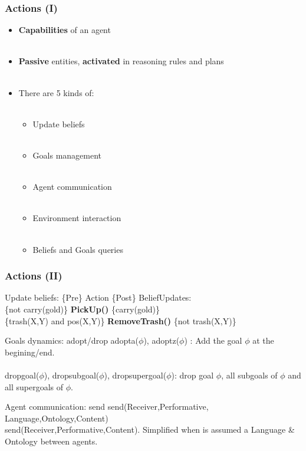 \documentclass{beamer}
\newcommand\tab[1][1cm]{\hspace*{#1}}
\begin{document}
\begin{frame}
\frametitle{Actions (I)}
	\begin{itemize}
    	\item \textbf{Capabilities} of an agent \\~\\
        \item \textbf{Passive} entities, \textbf{activated} in reasoning rules and plans\\~\\
        \item There are 5 kinds of:\\~\\
        \begin{itemize}
        	\item Update beliefs\\~\\
            \item Goals management \\~\\
            \item Agent communication\\~\\
            \item Environment interaction\\~\\
            \item Beliefs and Goals queries
        \end{itemize}
    \end{itemize}
\end{frame}
\begin{frame}
\frametitle{Actions (II)}
	\begin{block}{Update beliefs: \{Pre\} Action \{Post\}}
      BeliefUpdates:\\
        \tab \{not carry(gold)\} \textbf{PickUp()} \{carry(gold)\}\\
        \tab \{trash(X,Y) and pos(X,Y)\} \textbf{RemoveTrash()} \{not trash(X,Y)\}
    \end{block}
    
    \begin{block}{Goals dynamics: adopt/drop}
      adopta($\phi$), adoptz($\phi$) : Add the goal $\phi$ at the begining/end.\\~\\
      dropgoal($\phi$), dropsubgoal($\phi$), dropsupergoal($\phi$): drop goal $\phi$, all subgoals of $\phi$ and all supergoals of $\phi$.
  	\end{block}
    
    \begin{block}{Agent communication: send}
    	send(Receiver,Performative, Language,Ontology,Content)\\
        
        send(Receiver,Performative,Content). Simplified when is assumed a Language \& Ontology between agents.
	\end{block}
\end{frame}
\end{document}
